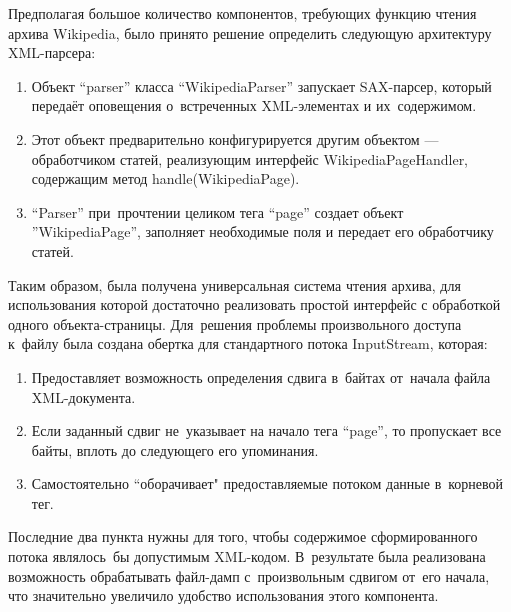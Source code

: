 Предполагая большое количество компонентов, требующих функцию чтения архива Wikipedia,
было принято решение определить следующую архитектуру XML-парсера:

\begin{enumerate}

\item{
Объект ``parser'' класса ``WikipediaParser'' запускает SAX-парсер, 
который передаёт оповещения о~встреченных XML-элементах и их~содержимом.
}

\item {
Этот объект предварительно конфигурируется другим объектом --- обработчиком статей,
 реализующим интерфейс WikipediaPageHandler, 
содержащим метод handle(WikipediaPage).
}

\item{
``Parser'' при~прочтении целиком тега ``page'' создает объект ''WikipediaPage'', 
заполняет необходимые поля и передает его обработчику статей.
}

\end{enumerate}


Таким образом, была получена универсальная система чтения архива, 
для использования которой достаточно реализовать простой интерфейс с обработкой одного объекта-страницы.
Для~решения проблемы произвольного доступа к~файлу была создана обертка для стандартного потока InputStream, которая:

\begin{enumerate}

\item{
Предоставляет возможность определения сдвига в~байтах от~начала файла XML-документа.
}

\item {
Если заданный сдвиг не~указывает на начало тега ``page'', 
то пропускает все байты, 
вплоть до следующего его упоминания.
}

\item{
Самостоятельно “оборачивает" предоставляемые потоком данные в~корневой тег.
}

\end{enumerate}

Последние два пункта нужны для того, чтобы содержимое сформированного потока являлось~бы допустимым XML-кодом.
В~результате была реализована возможность обрабатывать файл-дамп с~произвольным сдвигом от~его начала, 
что значительно увеличило удобство использования этого компонента.  

